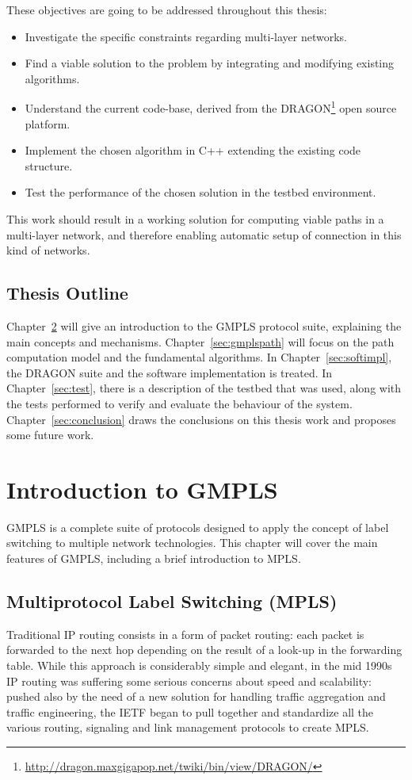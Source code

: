 \documentclass[10pt,a4paper]{report}
\begin{document}
These objectives are going to be addressed throughout this thesis:
\begin{itemize}
\item Investigate the specific constraints regarding multi-layer
  networks.
\item Find a viable solution to the problem by integrating and
  modifying existing algorithms.
\item Understand the current code-base, derived from the
  DRAGON\footnote{\url{http://dragon.maxgigapop.net/twiki/bin/view/DRAGON/}}
  open source platform.
\item Implement the chosen algorithm in C++ extending the existing
  code structure.
\item Test the performance of the chosen solution in the testbed
  environment.
\end{itemize}

This work should result in a working solution for computing viable
paths in a multi-layer network, and therefore enabling automatic setup
of connection in this kind of networks.

\section{Thesis Outline}

Chapter~\ref{sec:introgmpls} will give an introduction to the GMPLS
protocol suite, explaining the main concepts and
mechanisms. Chapter~\ref{sec:gmplspath} will focus on the path
computation model and the fundamental algorithms. In
Chapter~\ref{sec:softimpl}, the DRAGON suite and the software
implementation is treated. In Chapter~\ref{sec:test}, there is a
description of the testbed that was used, along with the tests
performed to verify and evaluate the behaviour of the
system. Chapter~\ref{sec:conclusion} draws the conclusions on this
thesis work and proposes some future work.

\chapter{Introduction to GMPLS}\label{sec:introgmpls}
GMPLS is a complete suite of protocols designed to apply the concept
of label switching to multiple network technologies. This chapter will
cover the main features of GMPLS, including a brief introduction to
MPLS.

\section{Multiprotocol Label Switching (MPLS)}
Traditional IP routing consists in a form of packet routing: each
packet is forwarded to the next hop depending on the result of a
look-up in the forwarding table. While this approach is considerably
simple and elegant, in the mid 1990s IP routing was suffering some
serious concerns about speed and scalability: pushed also by the need
of a new solution for handling traffic aggregation and traffic
engineering, the IETF began to pull together and standardize all the
various routing, signaling and link management protocols to create
MPLS.
\end{document}
